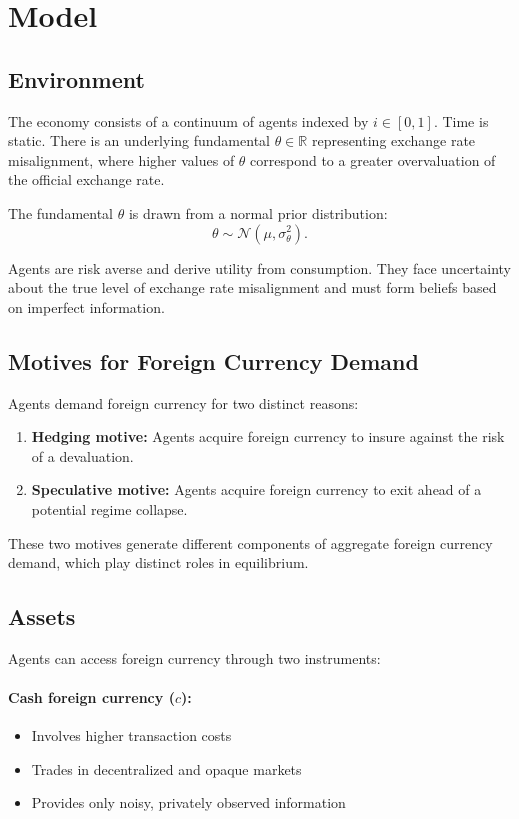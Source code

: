 \section{Model}

\subsection{Environment}

The economy consists of a continuum of agents indexed by $i \in [0,1]$. Time is static. There is an underlying fundamental $\theta \in \mathbb{R}$ representing exchange rate misalignment, where higher values of $\theta$ correspond to a greater overvaluation of the official exchange rate.

The fundamental $\theta$ is drawn from a normal prior distribution:
\begin{equation}
\theta \sim \mathcal{N}(\mu, \sigma_\theta^2).
\end{equation}

Agents are risk averse and derive utility from consumption. They face uncertainty about the true level of exchange rate misalignment and must form beliefs based on imperfect information.

\subsection{Motives for Foreign Currency Demand}

Agents demand foreign currency for two distinct reasons:

\begin{enumerate}
\item \textbf{Hedging motive:} Agents acquire foreign currency to insure against the risk of a devaluation.
\item \textbf{Speculative motive:} Agents acquire foreign currency to exit ahead of a potential regime collapse.
\end{enumerate}

These two motives generate different components of aggregate foreign currency demand, which play distinct roles in equilibrium.

\subsection{Assets}

Agents can access foreign currency through two instruments:

\paragraph{Cash foreign currency ($c$):}
\begin{itemize}
\item Involves higher transaction costs
\item Trades in decentralized and opaque markets
\item Provides only noisy, privately observed information
\end{itemize}

